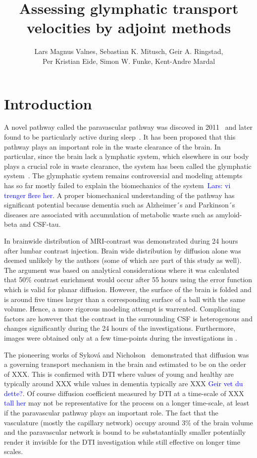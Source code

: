 \documentclass[11pt,a4paper]{article}
\title{Assessing glymphatic transport velocities by adjoint methods}
\author{Lars Magnus Valnes, Sebastian K. Mitusch, Geir A. Ringstad, \\ 
Per Kristian Eide, Simon W. Funke, Kent-Andre Mardal }
\newcommand{\kam}[1]{\textcolor{blue}{#1}}
\begin{document}
\maketitle

\begin{abstract}
\end{abstract}
\section{Introduction}

A novel pathway called the paravascular pathway was discoved in 2011~\cite{iliff2012paravascular} and later found to be particularly active during sleep~\cite{xie2013sleep}.  
It has been proposed that this pathway plays an important role in the waste
clearance of the brain. In particular, since the brain lack a lymphatic system, 
which elsewhere in our body plays a crucial role in waste clearance, the system has been called the glymphatic system~\cite{jessen2015glymphatic}.  
The glymphatic system remains controversial and modeling attempts
has so far mostly failed to explain the biomechanics of the system~\cite{asgari2016glymphatic, holter2017interstitial, smith2017glymphatic}\kam{Lars: vi trenger flere her}. A proper biomechanical 
understanding of the pathway has significant potential because
dementia such as Alzheimer´s and Parkinson´s diseases are
associated with accumulation of metabolic waste such as
amyloid-beta and CSF-tau.  

In \cite{ringstad2018brain} brainwide distribution of MRI-contrast was demonstrated during 24 hours after lumbar contrast injection. Brain wide distribution by diffusion alone was deemed unlikely by the authors (some of which are part 
of this study as well). The argument was based on analytical considerations where it was calculated that 50\% contrast enrichment would occur after 
55 hours using the error function which is valid for planar diffusion. However, 
the surface of the brain is folded and is around five times larger than 
a corresponding surface of a ball with the same volume. Hence, 
a more rigorous modeling attempt is warrented. Complicating factors
are however that the contrast in the surrounding CSF is heterogenous
and changes significantly during the 24 hours of the investigations. 
Furthermore, images were obtained only at a few time-points during the investigations in \cite{ringstad2018brain}.  

The pioneering works of Sykov{\'a} and Nicholson~\cite{sykova2008diffusion} demonstrated
that diffusion was a governing transport mechanism in the brain and estimated to be on the order
of XXX. This is confirmed with DTI where values of young and healthy are typically around XXX
while values in dementia typically are XXX \kam{Geir vet du dette?}. Of course diffusion coefficient 
measured by DTI at a time-scale of XXX \kam{tall her} may not be representative for the process on a
longer time-scale, at least if the paravascular pathway plays an important role. The fact that the vasculature (mostly 
the capillary network) occupy around 3\% of the brain volume and the paravascular network is bound to be substatantially
smaller potentially render it invisible for the DTI investigation while still effective on longer time scales.   
\end{document}
